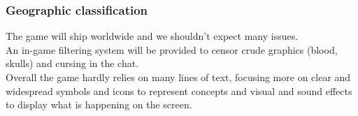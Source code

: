 \subsubsection{Geographic classification}
The game will ship worldwide and we shouldn't expect many issues. \\

An in-game filtering system will be provided to censor crude graphics (blood, skulls) and cursing in the chat. \\

Overall the game hardly relies on many lines of text, focusing more on clear and widespread symbols and icons to represent concepts and visual and sound effects to display what is happening on the screen.

\clearpage